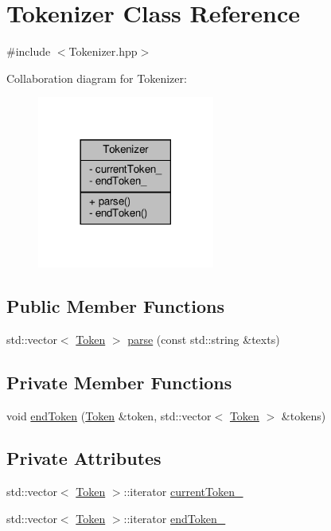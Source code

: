 \hypertarget{classft_1_1_tokenizer}{}\section{Tokenizer Class Reference}
\label{classft_1_1_tokenizer}


{\ttfamily \#include $<$Tokenizer.\+hpp$>$}



Collaboration diagram for Tokenizer\+:
\nopagebreak
\begin{figure}[H]
\begin{center}
\leavevmode
\includegraphics[width=165pt]{classft_1_1_tokenizer__coll__graph}
\end{center}
\end{figure}
\subsection*{Public Member Functions}
\begin{DoxyCompactItemize}
\item 
std\+::vector$<$ \hyperlink{classft_1_1_token}{Token} $>$ \hyperlink{classft_1_1_tokenizer_a10bacfc70f3d74a0e04218c1df86f6c2}{parse} (const std\+::string \&texts)
\end{DoxyCompactItemize}
\subsection*{Private Member Functions}
\begin{DoxyCompactItemize}
\item 
void \hyperlink{classft_1_1_tokenizer_a4d9a98ce2e5ef728cfa5a68c8f726587}{end\+Token} (\hyperlink{classft_1_1_token}{Token} \&token, std\+::vector$<$ \hyperlink{classft_1_1_token}{Token} $>$ \&tokens)
\end{DoxyCompactItemize}
\subsection*{Private Attributes}
\begin{DoxyCompactItemize}
\item 
std\+::vector$<$ \hyperlink{classft_1_1_token}{Token} $>$\+::iterator \hyperlink{classft_1_1_tokenizer_a942c5b794d108f144c5b5028aaa34cb6}{current\+Token\+\_\+}
\item 
std\+::vector$<$ \hyperlink{classft_1_1_token}{Token} $>$\+::iterator \hyperlink{classft_1_1_tokenizer_a538ba3ab8ee1d0cef5cc3c999f3ab44c}{end\+Token\+\_\+}
\end{DoxyCompactItemize}


